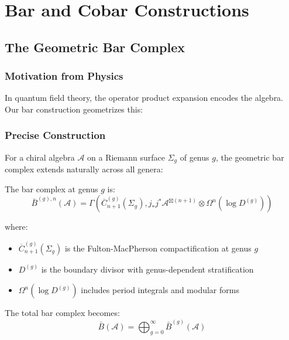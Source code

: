 \chapter{Bar and Cobar Constructions}
\section{The Geometric Bar Complex}

\subsection{Motivation from Physics}

In quantum field theory, the operator product expansion encodes the algebra. Our bar construction geometrizes this:

\begin{center}
\end{center}

\subsection{Precise Construction}

For a chiral algebra $\mathcal{A}$ on a Riemann surface $\Sigma_g$ of genus $g$, the geometric bar complex extends naturally across all genera:

\begin{definition}
The bar complex at genus $g$ is:
$$\bar{B}^{(g),n}(\mathcal{A}) = \Gamma\left(\overline{C}_{n+1}^{(g)}(\Sigma_g), j_*j^*\mathcal{A}^{\boxtimes(n+1)} \otimes \Omega^n(\log D^{(g)})\right)$$

where:
\begin{itemize}
\item $\overline{C}_{n+1}^{(g)}(\Sigma_g)$ is the Fulton-MacPherson compactification at genus $g$
\item $D^{(g)}$ is the boundary divisor with genus-dependent stratification
\item $\Omega^n(\log D^{(g)})$ includes period integrals and modular forms
\end{itemize}

The total bar complex becomes:
$$\bar{B}(\mathcal{A}) = \bigoplus_{g=0}^{\infty} \bar{B}^{(g)}(\mathcal{A})$$
\end{definition}

